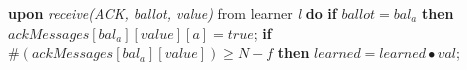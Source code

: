 \begin{algorithm}
\begin{algorithmic}[1]
		\State 
		\State \textbf{upon} \textit{receive(ACK, ballot, value)} from learner \textit{l} \textbf{do}
		\State \hspace{\algorithmicindent}\textbf{if} $ballot = bal_a$ \textbf{then}
		\State \hspace{\algorithmicindent}\hspace{\algorithmicindent} $ackMessages[bal_a][value][a] = true$;
		\State \hspace{\algorithmicindent}\hspace{\algorithmicindent} \textbf{if} $\#(ackMessages[bal_a][value]) \geq N-f$ \textbf{then}
		\State\hspace{\algorithmicindent}\hspace{\algorithmicindent} \hspace{\algorithmicindent} $learned = learned \bullet val$;
		
	\end{algorithmic}
\end{algorithm}
